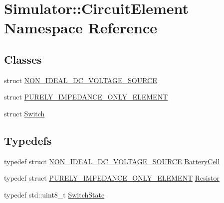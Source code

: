 \hypertarget{namespace_simulator_1_1_circuit_element}{}\section{Simulator\+:\+:Circuit\+Element Namespace Reference}
\label{namespace_simulator_1_1_circuit_element}
\subsection*{Classes}
\begin{DoxyCompactItemize}
\item 
struct \hyperlink{struct_simulator_1_1_circuit_element_1_1_n_o_n___i_d_e_a_l___d_c___v_o_l_t_a_g_e___s_o_u_r_c_e}{N\+O\+N\+\_\+\+I\+D\+E\+A\+L\+\_\+\+D\+C\+\_\+\+V\+O\+L\+T\+A\+G\+E\+\_\+\+S\+O\+U\+R\+C\+E}
\item 
struct \hyperlink{struct_simulator_1_1_circuit_element_1_1_p_u_r_e_l_y___i_m_p_e_d_a_n_c_e___o_n_l_y___e_l_e_m_e_n_t}{P\+U\+R\+E\+L\+Y\+\_\+\+I\+M\+P\+E\+D\+A\+N\+C\+E\+\_\+\+O\+N\+L\+Y\+\_\+\+E\+L\+E\+M\+E\+N\+T}
\item 
struct \hyperlink{struct_simulator_1_1_circuit_element_1_1_switch}{Switch}
\end{DoxyCompactItemize}
\subsection*{Typedefs}
\begin{DoxyCompactItemize}
\item 
typedef struct \hyperlink{struct_simulator_1_1_circuit_element_1_1_n_o_n___i_d_e_a_l___d_c___v_o_l_t_a_g_e___s_o_u_r_c_e}{N\+O\+N\+\_\+\+I\+D\+E\+A\+L\+\_\+\+D\+C\+\_\+\+V\+O\+L\+T\+A\+G\+E\+\_\+\+S\+O\+U\+R\+C\+E} \hyperlink{namespace_simulator_1_1_circuit_element_a2f25ffbed70e35fab058b16f65277c9e}{Battery\+Cell}
\item 
typedef struct \hyperlink{struct_simulator_1_1_circuit_element_1_1_p_u_r_e_l_y___i_m_p_e_d_a_n_c_e___o_n_l_y___e_l_e_m_e_n_t}{P\+U\+R\+E\+L\+Y\+\_\+\+I\+M\+P\+E\+D\+A\+N\+C\+E\+\_\+\+O\+N\+L\+Y\+\_\+\+E\+L\+E\+M\+E\+N\+T} \hyperlink{namespace_simulator_1_1_circuit_element_afde5004825abefab1d1e0bc721648463}{Resistor}
\item 
typedef std\+::uint8\+\_\+t \hyperlink{namespace_simulator_1_1_circuit_element_a6774cddc1f4df8530170b06473f198d1}{Switch\+State}
\end{DoxyCompactItemize}


